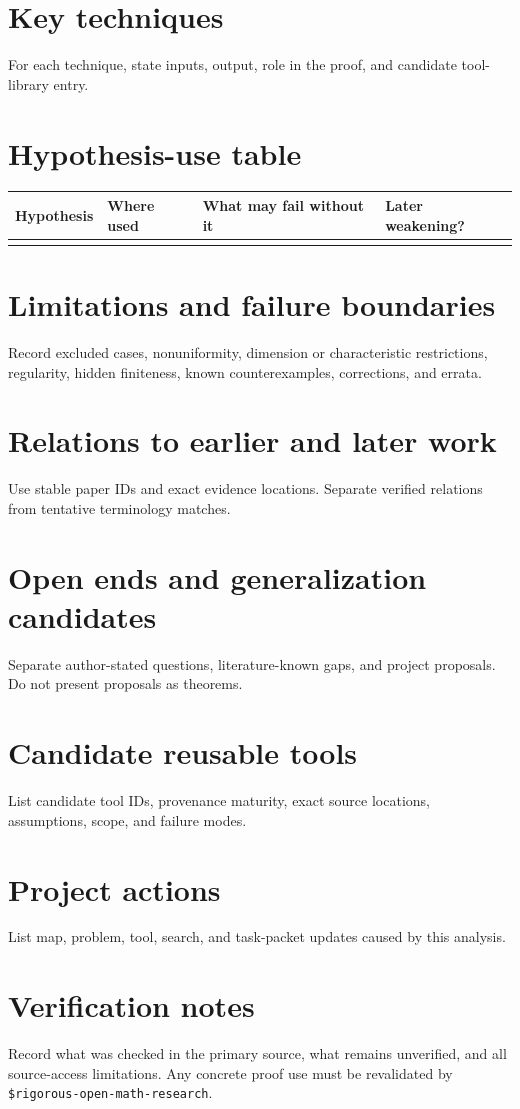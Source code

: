 \documentclass[11pt]{article}
\begin{document}
\section{Key techniques}
For each technique, state inputs, output, role in the proof, and candidate tool-library entry.

\section{Hypothesis-use table}
\begin{longtable}{p{}p{}p{}p{}}
\toprule
Hypothesis & Where used & What may fail without it & Later weakening? \\
\midrule
\endhead
 & & & \\
\bottomrule
\end{longtable}

\section{Limitations and failure boundaries}
Record excluded cases, nonuniformity, dimension or characteristic restrictions, regularity, hidden finiteness, known counterexamples, corrections, and errata.

\section{Relations to earlier and later work}
Use stable paper IDs and exact evidence locations. Separate verified relations from tentative terminology matches.

\section{Open ends and generalization candidates}
Separate author-stated questions, literature-known gaps, and project proposals. Do not present proposals as theorems.

\section{Candidate reusable tools}
List candidate tool IDs, provenance maturity, exact source locations, assumptions, scope, and failure modes.

\section{Project actions}
List map, problem, tool, search, and task-packet updates caused by this analysis.

\section{Verification notes}
Record what was checked in the primary source, what remains unverified, and all source-access limitations. Any concrete proof use must be revalidated by \texttt{\$rigorous-open-math-research}.
\end{document}
